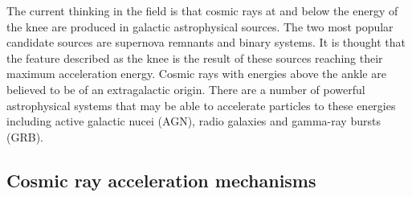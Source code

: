 The current thinking in the field is that cosmic rays at and below the energy of the knee are produced in galactic astrophysical sources. The two most popular candidate sources are supernova remnants and binary systems. It is thought that the feature described as the knee is the result of these sources reaching their maximum acceleration energy. Cosmic rays with energies above the ankle are believed to be of an extragalactic origin. There are a number of powerful astrophysical systems that may be able to accelerate particles to these energies including active galactic nucei (AGN), radio galaxies and gamma-ray bursts (GRB).


\subsection{Cosmic ray acceleration mechanisms}







